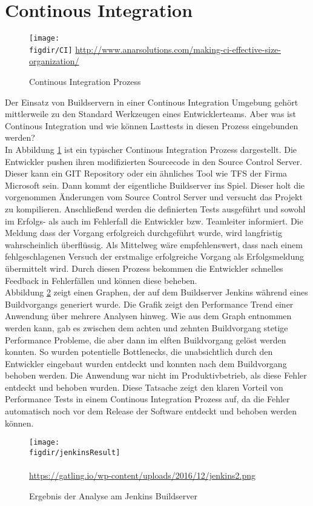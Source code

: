 \section{Continous Integration}

\begin{figure}
	{\caption{Continous Integration Prozess}
		\label{fig:continousIntegration}}
	{\texttt{[image: \\figdir/CI]}}
	\tiny{\quelle\url{http://www.anarsolutions.com/making-ci-effective-size-organization/}}
\end{figure}

Der Einsatz von Buildservern in einer Continous Integration Umgebung gehört mittlerweile zu den Standard Werkzeugen eines Entwicklerteams. Aber was ist Continous Integration und wie können Lasttests in diesen Prozess eingebunden werden?\\
In Abbildung \ref{fig:continousIntegration} ist ein typischer Continous Integration Prozess dargestellt. Die Entwickler pushen ihren modifizierten Sourcecode in den Source Control Server. Dieser kann ein GIT Repository oder ein ähnliches Tool wie \ac{TFS} der Firma Microsoft sein. Dann kommt der eigentliche Buildserver ins Spiel. Dieser holt die vorgenommen Änderungen vom Source Control Server und versucht das Projekt zu kompilieren. Anschließend werden die definierten Tests ausgeführt und sowohl im Erfolgs- als auch im Fehlerfall die Entwickler bzw. Teamleiter informiert. Die Meldung dass der Vorgang erfolgreich durchgeführt wurde, wird langfristig wahrscheinlich überflüssig. Als Mittelweg wäre empfehlenswert, dass nach einem fehlgeschlagenen Versuch der erstmalige erfolgreiche Vorgang als Erfolgsmeldung übermittelt wird. Durch diesen Prozess bekommen die Entwickler schnelles Feedback in Fehlerfällen und können diese beheben.\\
Abbildung \ref{fig:jenkinsBuildResult} zeigt einen Graphen, der auf dem Buildserver \glqq Jenkins\grqq{} während eines Buildvorgangs generiert wurde. Die Grafik zeigt den \glqq Performance Trend\grqq{} einer Anwendung über mehrere Analysen hinweg. Wie aus dem Graph entnommen werden kann, gab es zwischen dem achten und zehnten Buildvorgang stetige Performance Probleme, die aber dann im elften Buildvorgang gelöst werden konnten. So wurden potentielle Bottlenecks, die unabsichtlich durch den Entwickler eingebaut wurden entdeckt und konnten nach dem Buildvorgang behoben werden. Die Anwendung war nicht im Produktivbetrieb, als diese Fehler entdeckt und behoben wurden. Diese Tatsache zeigt den klaren Vorteil von Performance Tests in einem Continous Integration Prozess auf, da die Fehler automatisch noch vor dem Release der Software entdeckt und behoben werden können.
\begin{figure}
	{\caption{Ergebnis der Analyse am Jenkins Buildserver}
		\label{fig:jenkinsBuildResult}}
	{\texttt{[image: \\figdir/jenkinsResult]}}\\~\\
				\tiny{\quelle\url{https://gatling.io/wp-content/uploads/2016/12/jenkins2.png}}
\end{figure}


